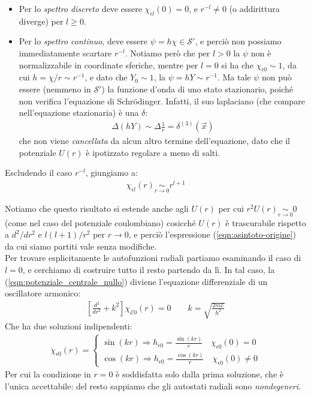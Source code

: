 \documentclass[../../FisicaTeorica.tex]{subfiles}
\begin{document}
\begin{itemize}
\item Per lo \textit{spettro discreto} deve essere $\chi_{\epsilon l}(0) = 0$, e $r^{-l} \neq 0$ (o addirittura diverge) per $l\geq 0$.
\item Per lo \textit{spettro continuo}, deve essere $\psi=h\chi \in \mathcal{S}'$, e perciò non possiamo immediatamente scartare $r^{-l}$. Notiamo però che per $l>0$ la $\psi$ non è normalizzabile in coordinate sferiche, mentre per $l=0$ si ha che $\chi_{\epsilon 0}\sim1$, da cui $h=\chi/r \sim r^{-1}$, e dato che $Y_0 \sim 1$, la $\psi = hY \sim r^{-1}$. Ma tale $\psi$ non può essere (nemmeno in $\mathcal{S}'$) la funzione d'onda di uno stato stazionario, poiché non verifica l'equazione di Schr\"odinger. Infatti, il suo laplaciano (che compare nell'equazione stazionaria) è una $\delta$:
\begin{align*}
\Delta(hY)\sim \Delta \frac{1}{r} = \delta^{(3)}(\vec{x})
\end{align*}
che non viene \textit{cancellata} da alcun altro termine dell'equazione, dato che il potenziale $U(r)$ è ipotizzato regolare a meno di salti.
\end{itemize}
Escludendo il caso $r^{-l}$, giungiamo a:
\begin{align*}
\chi_{\epsilon l} (r) \underset{r \to 0}{\sim} r^{l+1}
\end{align*}

Notiamo che questo risultato si estende anche agli $U(r)$ per cui $r^2 U(r) \underset{r\to 0}{\sim} 0$ (come nel caso del potenziale coulombiano) cosicché $U(r)$ è trascurabile rispetto a $d^2/dr^2$ e $l(l+1)/r^2$ per $r\to 0$, e perciò l'espressione (\ref{eqn:asintoto-origine}) da cui siamo partiti vale senza modifiche.\\

Per trovare esplicitamente le autofunzioni radiali partiamo esaminando il caso di $l=0$, e cerchiamo di costruire tutto il resto partendo da lì. In tal caso, la (\ref{eqn:potenziale_centrale_nullo})
diviene l'equazione differenziale di un oscillatore armonico:
\begin{align}
\left[\frac{d^2}{dr^2} + k^2 \right] \chi_{\mathcal{E}0} (r) = 0 \qquad k = \sqrt{\frac{2m\mathcal{E}}{\hbar^2}}
\label{eqn:pot-centrale-nullo-differenziale}
\end{align}
Che ha due soluzioni indipendenti:
\begin{align*}
\chi_{\epsilon 0}(r)=
\begin{cases}
\sin(k r) \Rightarrow  h_{\epsilon 0}=\frac{\sin(kr)}{r} \quad \chi_{\epsilon 0}(0) = 0\\
\cos(kr)  \Rightarrow  h_{\epsilon 0} = \frac{\cos(kr)}{r} \quad \chi_{\epsilon 0}(0) \neq 0
\end{cases}
\end{align*}
Per cui la condizione in $r=0$ è soddisfatta solo dalla prima soluzione, che è l'unica accettabile: del resto sappiamo che gli autostati radiali sono \textit{nondegeneri}.\\
\end{document}
